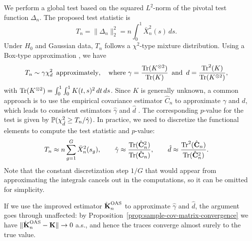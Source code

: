We perform a global test based on the squared \(L^2\)-norm of the pivotal test function \(\Delta_n\). The proposed test statistic is
\begin{equation}\label{eq:test-statistic-l2}
T_n = \|\Delta_n\|^2_2 = n\int_0^1 \bar{X}_n^2(s)\, ds.
\end{equation}
Under \(H_0\) and Gaussian data, \(T_n\) follows a \(\chi^2\)-type mixture distribution. Using a Box-type approximation \citep{box1954some}, we have
\[
T_n \sim \gamma \chi^2_d\,  \text{ approximately}, \quad \text{where } \gamma = \frac{\operatorname{Tr}(K^{\otimes 2})}{\operatorname{Tr}(K)}\, \text{ and }\, d=\frac{\operatorname{Tr}^2(K)}{\operatorname{Tr}(K^{\otimes 2})},
\]
with \(\operatorname{Tr}(K^{\otimes 2}) = \int_0^1 \int_0^1 K(t,s)^2 \, dt\, ds\). Since \(K\) is generally unknown, a common approach is to use the empirical covariance estimator \(\hat C_n\) to approximate \(\gamma\) and \(d\), which leads to consistent estimators \(\hat\gamma\) and \(\hat d\) \citep[Theorem~4.17]{zhang2013analysis}. The corresponding \(p\)-value for the test is given by \(\mathbb{P}(\chi^2_{\hat d} \geq T_n/\hat \gamma)\). In practice, we need to discretize the functional elements to compute the test statistic and \(p\)-value:
\[
T_n \approx n\sum_{g=1}^G \bar{X}_n^2(s_g), \qquad \hat \gamma \approx \frac{\operatorname{Tr}(\hat{\mathbf C}_n^2)}{\operatorname{Tr}(\hat{\mathbf C}_n)}, \qquad \hat d \approx \frac{\operatorname{Tr}^2(\hat{\mathbf C}_n)}{\operatorname{Tr}(\hat{\mathbf C}_n^2)}.
\]
Note that the constant discretization step \(1/G\) that would appear from approximating the integrals cancels out in the computations, so it can be omitted for simplicity.

\begin{remark}
  If we use the improved estimator \(\hatbfKnOAS\) to approximate \(\hat \gamma\) and \(\hat d\), the argument goes through unaffected: by Proposition~\ref{prop:sample-cov-matrix-convergence} we have \(\|\hatbfKnOAS - \mathbf{K}\| \to 0\) a.s., and hence the traces converge almost surely to the true value.
\end{remark}

